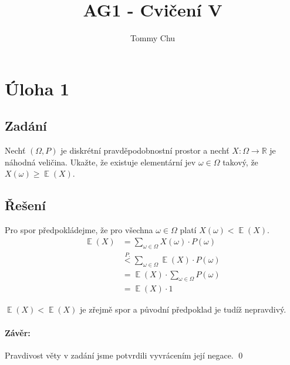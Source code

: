 \documentclass{article}
\title{AG1 - Cvičení V}
\author{Tommy Chu}
\date{}
\DeclareMathOperator{\E}{\mathbb{E}}
\begin{document}
\maketitle

\section*{Úloha 1}

\subsection*{Zadání}
Nechť ${(\Omega, P)}$ je diskrétní pravděpodobnostní prostor a nechť ${X \colon \Omega \rightarrow \mathbb{R}}$ je náhodná veličina. Ukažte, že existuje elementární jev ${\omega \in \Omega}$ takový, že ${X(\omega) \ge \E(X)}$.

\subsection*{Řešení}

Pro spor předpokládejme, že pro všechna ${\omega \in \Omega}$ platí ${X(\omega) < \E(X)}$.
\begin{align*}
    \E(X) & = \sum_{\omega \in \Omega} X(\omega) \cdot P(\omega)            \\
          & \stackrel{P.}{<} \sum_{\omega \in \Omega} \E(X) \cdot P(\omega) \\
          & = \E(X) \cdot \sum_{\omega \in \Omega} P(\omega)                \\
          & = \E(X) \cdot 1
\end{align*}

$\E(X) < \E(X)$ je zřejmě spor a původní předpoklad je tudíž nepravdivý.

\paragraph*{Závěr:} Pravdivost věty v zadání jsme potvrdili vyvrácením její negace.
\qed
\end{document}
